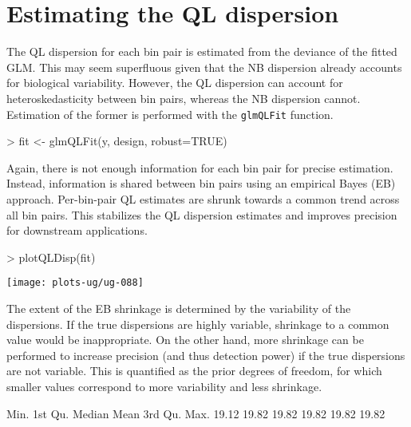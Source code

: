 \documentclass[12pt]{report}
\renewenvironment{Schunk}{\vspace{0pt}}{\vspace{0pt}}
\newcommand{\code}[1]{{\small\texttt{#1}}}
\begin{document}
\section{Estimating the QL dispersion}
The QL dispersion for each bin pair is estimated from the deviance of the fitted GLM.
This may seem superfluous given that the NB dispersion already accounts for biological variability.
However, the QL dispersion can account for heteroskedasticity between bin pairs, whereas the NB dispersion cannot.
Estimation of the former is performed with the \code{glmQLFit} function.

\begin{Schunk}
\begin{Sinput}
> fit <- glmQLFit(y, design, robust=TRUE)
\end{Sinput}
\end{Schunk}

Again, there is not enough information for each bin pair for precise estimation.
Instead, information is shared between bin pairs using an empirical Bayes (EB) approach.
Per-bin-pair QL estimates are shrunk towards a common trend across all bin pairs.
This stabilizes the QL dispersion estimates and improves precision for downstream applications.

\begin{Schunk}
\begin{Sinput}
> plotQLDisp(fit)
\end{Sinput}
\end{Schunk}

\begin{center}
\texttt{[image: plots-ug/ug-088]}
\end{center}

The extent of the EB shrinkage is determined by the variability of the dispersions.
If the true dispersions are highly variable, shrinkage to a common value would be inappropriate.
On the other hand, more shrinkage can be performed to increase precision (and thus detection power) if the true dispersions are not variable.
This is quantified as the prior degrees of freedom, for which smaller values correspond to more variability and less shrinkage.

\begin{Schunk}
\begin{Soutput}
   Min. 1st Qu.  Median    Mean 3rd Qu.    Max. 
  19.12   19.82   19.82   19.82   19.82   19.82 
\end{Soutput}
\end{Schunk}
\end{document}
